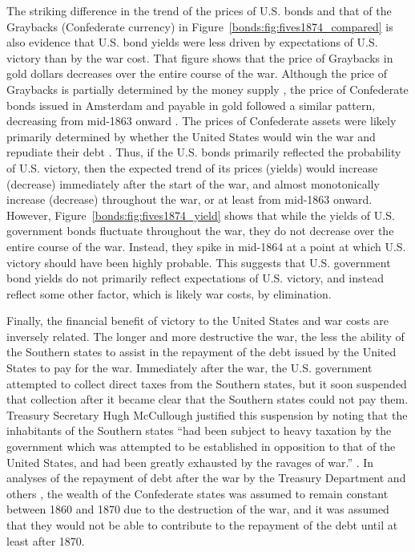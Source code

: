 The striking difference in the trend of the prices of U.S. bonds and that of the Graybacks (Confederate currency) in Figure~\ref{bonds:fig:fives1874_compared} is also evidence that U.S. bond yields were less driven by expectations of U.S. victory than by the war cost.
That figure shows that the price of Graybacks in gold dollars decreases over the entire course of the war.
Although the price of Graybacks is partially determined by the money supply \parencite{BurdekinWeidenmier2001}, the price of Confederate bonds issued in Amsterdam and payable in gold followed a similar pattern, decreasing from  mid-1863 onward \parencite{HaberMitchenerOosterlinckEtAl2015}.
The prices of Confederate assets were likely primarily determined by whether the United States would win the war and repudiate their debt \parencite{HaberMitchenerOosterlinckEtAl2015}.
Thus, if the U.S. bonds primarily reflected the probability of U.S. victory, then the expected trend of its prices (yields) would increase (decrease) immediately after the start of the war, and almost monotonically increase (decrease) throughout the war, or at least from mid-1863 onward.
However, Figure~\ref{bonds:fig:fives1874_yield} shows that while the yields of U.S. government bonds fluctuate throughout the war, they do not decrease over the entire course of the war.
Instead, they spike in mid-1864 at a point at which U.S. victory should have been highly probable.
This suggests that U.S. government bond yields do not primarily reflect expectations of U.S. victory, and instead reflect some other factor, which is likely war costs, by elimination.

Finally, the financial benefit of victory to the United States and war costs are inversely related.
The longer and more destructive the war, the less the ability of the Southern states to assist in the repayment of the debt issued by the United States to pay for the war.
Immediately after the war, the U.S. government attempted to collect direct taxes from the Southern states, but it soon suspended that collection after it became clear that the Southern states could not pay them.
Treasury Secretary Hugh McCullough justified this suspension by noting that the inhabitants of the Southern states ``had been subject to heavy taxation by the government which was attempted to be established in opposition to that of the United States, and had been greatly exhausted by the ravages of war.'' \parencite[29]{Treasury1865}.
In analyses of the repayment of debt after the war by the Treasury Department and others \parencites{Elder1865}{Treasury1865}{Walker1865a}, the wealth of the Confederate states was assumed to remain constant between 1860 and 1870 due to the destruction of the war, and it was assumed that they would not be able to contribute to the repayment of the debt until at least after 1870.

